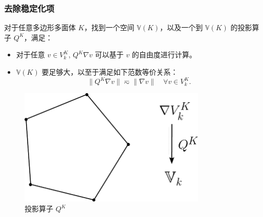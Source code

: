 \documentclass[notheorems,serif]{beamer}
\begin{document}
\begin{frame}
    \frametitle{去除稳定化项}
    \begin{minipage}[b]{0.55\linewidth}
    对于任意多边形多面体 $K$，找到一个空间 $\mathbb{V}(K)$，以及一个到
    $\mathbb{V}(K)$ 的投影算子 $Q^K$，满足：
    \begin{itemize}
        \item 对于任意 $v \in V_k^K$, $Q^K \nabla v$ 可以基于 $v$
            的自由度进行计算。
        \item $\mathbb{V}(K)$ 要足够大，以至于满足如下范数等价关系：
            $$
            \|Q^K \nabla v\| \eqsim \|\nabla v\| \quad \forall v \in V_k^K.
            $$
    \end{itemize}
\end{minipage}
\hfill
\begin{minipage}[b]{0.44\linewidth}
    \begin{figure}[htpb]
        \centering
        \includegraphics[width=0.8\textwidth]{../figures/projection.pdf}
        \caption{投影算子 $Q^K$}
    \end{figure}
\end{minipage}
\end{frame}
\end{document}
